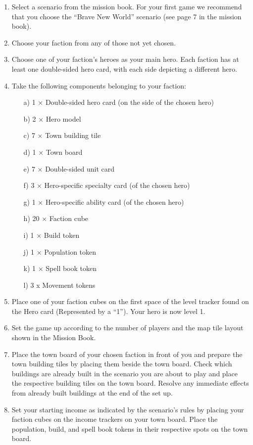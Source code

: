 \documentclass[12pt]{article}
\begin{document}
\begin{enumerate}
\item Select a scenario from the mission book. For your first game we recommend that you choose the “Brave New World” scenario (see page 7 in the mission book).
\item Choose your faction from any of those not yet chosen.
\item Choose one of your faction’s heroes as your main hero. Each faction has at least one double-sided hero card, with each side depicting a different hero.
\item Take the following components belonging to your faction:
\begin{itemize}
\item[a)]1 × Double-sided hero card (on the side of the chosen hero)
\item[b)]2 × Hero model
\item[c)]7 × Town building tile
\item[d)]1 × Town board
\item[e)]7 × Double-sided unit card
\item[f)]3 × Hero-specific specialty card (of the chosen hero)
\item[g)]1 × Hero-specific ability card (of the chosen hero)
\item[h)]20 × Faction cube
\item[i)]1 × Build token
\item[j)]1 × Population token
\item[k)]1 × Spell book token
\item[l)]3 x Movement tokens
\end{itemize}
\item Place one of your faction cubes on the first space of the level tracker found on the Hero card (Represented by a “1”). Your hero is now level 1.
\item Set the game up according to the number of players and the map tile layout shown in the Mission Book.
\item Place the town board of your chosen faction in front of you and prepare the town building tiles by placing them beside the town board. Check which buildings are already built in the scenario you are about to play and place the respective building tiles on the town board. Resolve any immediate effects from already built buildings at the end of the set up.
\item Set your starting income as indicated by the scenario’s rules by placing your faction cubes on the income trackers on your town board. Place the population, build, and spell book tokens in their respective spots on the town board.

\end{enumerate}
\end{document}

